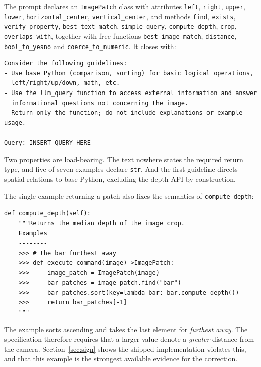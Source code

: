 \documentclass[12pt,a4paper,oneside]{report}
\begin{document}
The prompt declares an \texttt{ImagePatch} class with attributes \texttt{left},
\texttt{right}, \texttt{upper}, \texttt{lower}, \texttt{horizontal\_center},
\texttt{vertical\_center}, and methods \texttt{find}, \texttt{exists},
\texttt{verify\_property}, \texttt{best\_text\_match}, \texttt{simple\_query},
\texttt{compute\_depth}, \texttt{crop}, \texttt{overlaps\_with}, together with free
functions \texttt{best\_image\_match}, \texttt{distance}, \texttt{bool\_to\_yesno} and
\texttt{coerce\_to\_numeric}. It closes with:

\begin{lstlisting}[style=plainlist]
Consider the following guidelines:
- Use base Python (comparison, sorting) for basic logical operations,
  left/right/up/down, math, etc.
- Use the llm_query function to access external information and answer
  informational questions not concerning the image.
- Return only the function; do not include explanations or example usage.

Query: INSERT_QUERY_HERE
\end{lstlisting}

Two properties are load-bearing. The text nowhere states the required return type, and
five of seven examples declare \texttt{str}. And the first guideline directs spatial
relations to base Python, excluding the depth API by construction.

The single example returning a patch also fixes the semantics of
\texttt{compute\_depth}:

\begin{lstlisting}[caption={The only example in the released prompt that returns an
\texttt{ImagePatch}, quoted verbatim from \texttt{prompts/api.prompt}, lines 100--110.}]
def compute_depth(self):
    """Returns the median depth of the image crop.
    Examples
    --------
    >>> # the bar furthest away
    >>> def execute_command(image)->ImagePatch:
    >>>     image_patch = ImagePatch(image)
    >>>     bar_patches = image_patch.find("bar")
    >>>     bar_patches.sort(key=lambda bar: bar.compute_depth())
    >>>     return bar_patches[-1]
    """
\end{lstlisting}

The example sorts ascending and takes the last element for \emph{furthest away}. The
specification therefore requires that a larger value denote a \emph{greater} distance
from the camera. Section~\ref{sec:sign} shows the shipped implementation violates
this, and that this example is the strongest available evidence for the correction.
\end{document}
